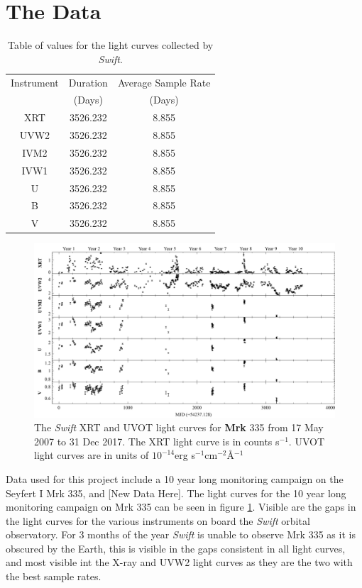 \documentclass[12pt, oneside]{smuthesis}
\begin{document}
\section{\sc The Data} \label{theData}

\setlength{\tabcolsep}{18pt}
\renewcommand{\arraystretch}{1.5}

\begin{table}[b!]
	\centering
	\begin{tabular}{ c c c }
		\hline\hline
		Instrument & Duration & Average Sample Rate \\
		& (Days) & (Days) \\
		\hline
		XRT & 3526.232 & 8.855 \\
		UVW2 & 3526.232 & 8.855 \\
		IVM2 & 3526.232 & 8.855 \\
		IVW1 & 3526.232 & 8.855 \\
		U & 3526.232 & 8.855 \\
		B & 3526.232 & 8.855 \\
		V & 3526.232 & 8.855 \\
		\hline
	\end{tabular}
	\caption{Table of values for the light curves collected by \textit{Swift}.}
\end{table}

\begin{figure}
	\centering
	\includegraphics[width=0.8\linewidth]{mkn335Lightcurves}
	\caption{The \textit{Swift} XRT and UVOT light curves for \textbf{Mrk} 335 from 17 May 2007 to 31 Dec 2017. The XRT light curve is in counts s$^{-1}$. UVOT light curves are in units of $10^{-14}$erg s$^{-1}$cm$^{-2}$\AA$^{-1}$}
	\label{fig:mkn335LC}
\end{figure}

Data used for this project include a 10 year long monitoring campaign on the Seyfert I Mrk 335, and [New Data Here]. The light curves for the 10 year long monitoring campaign on Mrk 335 can be seen in figure \ref{fig:mkn335LC}. Visible are the gaps in the light curves for the various instruments on board the \textit{Swift} orbital observatory. For 3 months of the year \textit{Swift} is unable to observe Mrk 335 as it is obscured by the Earth, this is visible in the gaps consistent in all light curves, and most visible int the X-ray and UVW2 light curves as they are the two with the best sample rates.
\end{document}

